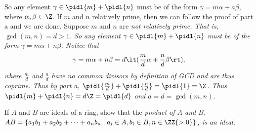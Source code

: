 \documentclass{article}
\begin{document}
\begin{solution}
\begin{enumerate}[label=\bd{\alph*.}]
    So any element \(\gamma\in\pidl{m} + \pidl{n} \) must be of the form \( \gamma=m\alpha+a\beta \), where \( \alpha,\beta\in\Z \).
    If \( m \) and \( n \) relatively prime, then we can follow the proof of part a and we are done.
    Suppose \( m \) and \( n \) are \it{not} relatively prime. That is, \( \gcd(m,n) = d > 1\). So any element \( \gamma\in\pidl{m}+\pidl{n} \) must be of the form \( \gamma=m\alpha+n\beta \). Notice that \begin{align*}
      \gamma = m\alpha+n\beta = d\lt(\frac{m}{d}\alpha+\frac{n}{d}\beta\rt),
    \end{align*} where \( \frac{m}{d} \) and \( \frac{n}{d} \) have no common divisors by definition of GCD and are thus coprime.
    Thus by part a, \( \pidl{\frac{m}{d}}+\pidl{\frac{n}{d}}=\pidl{1}=\Z \).
    Thus \( \pidl{m}+\pidl{n} = d\Z = \pidl{d} \) and \( a = d = \gcd(m,n) \).
\end{enumerate}
\end{solution}

If \( A \) and \( B \) are ideals of a ring, show that the \it{product} of \( A \) and \( B \), \( AB = \{a_1b_1 + a_2b_2 + \cdots + a_nb_n \mid a_i\in A, b_i\in B, n \in\ZZ{>0}\} \), is an ideal.
\end{document}
